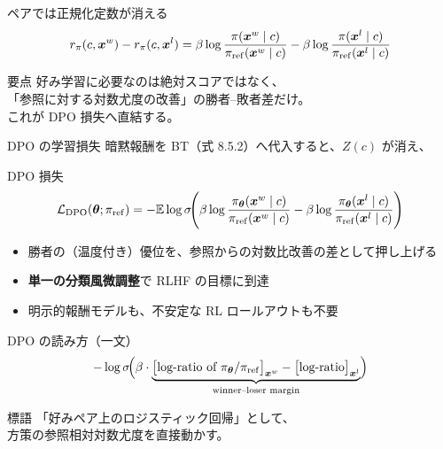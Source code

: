 \asmain
\begin{frame}{ペアでは正規化定数が消える}
    \[
        r_{\pi}(c,\bm{x}^w)-r_{\pi}(c,\bm{x}^l)
        =
        \beta\log\frac{\pi(\bm{x}^w\mid c)}{\pi_{\mathrm{ref}}(\bm{x}^w\mid c)}
        -
        \beta\log\frac{\pi(\bm{x}^l\mid c)}{\pi_{\mathrm{ref}}(\bm{x}^l\mid c)}
    \]
    \begin{exampleblock}{要点}
        好み学習に必要なのは絶対スコアではなく、\\
        「参照に対する対数尤度の改善」の勝者--敗者差だけ。\\
        これが DPO 損失へ直結する。
    \end{exampleblock}
\end{frame}
\asmain
\begin{frame}{DPO の学習損失}
    暗黙報酬を BT（式 8.5.2）へ代入すると、$Z(c)$ が消え、
    \begin{block}{DPO 損失}
        \[
            \mathcal{L}_{\mathrm{DPO}}(\bm{\theta};\pi_{\mathrm{ref}})
            =
            -\mathbb{E}
            \log\sigma\!\Biggl(
            \beta\log\frac{\pi_{\bm{\theta}}(\bm{x}^w\mid c)}{\pi_{\mathrm{ref}}(\bm{x}^w\mid c)}
            -
            \beta\log\frac{\pi_{\bm{\theta}}(\bm{x}^l\mid c)}{\pi_{\mathrm{ref}}(\bm{x}^l\mid c)}
            \Biggr)
        \]
    \end{block}
    \begin{itemize}
        \item 勝者の（温度付き）優位を、参照からの対数比改善の差として押し上げる
        \item \textbf{単一の分類風微調整}で RLHF の目標に到達
        \item 明示的報酬モデルも、不安定な RL ロールアウトも不要
    \end{itemize}
\end{frame}
\asmain
\begin{frame}{DPO の読み方（一文）}
    \[
        -\log\sigma\!\Bigl(
        \beta\cdot
        \underbrace{
        \bigl[\text{log-ratio of }\pi_{\bm{\theta}}/\pi_{\mathrm{ref}}\bigr]_{\bm{x}^w}
        -
        \bigl[\text{log-ratio}\bigr]_{\bm{x}^l}
        }_{\text{winner--loser margin}}
        \Bigr)
    \]
    \begin{alertblock}{標語}
        「好みペア上のロジスティック回帰」として、\\
        方策の参照相対対数尤度を直接動かす。
    \end{alertblock}
\end{frame}
